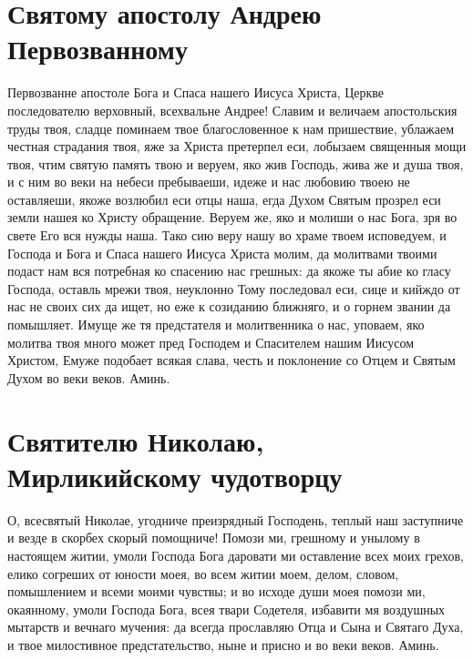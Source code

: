 \section{Святому апостолу Андрею Первозванному}
 


Первозванне апостоле Бога и Спаса нашего Иисуса Христа, Церкве последователю верховный, всехвальне Андрее! Славим и величаем апостольския труды твоя, сладце поминаем твое благословенное к нам пришествие, ублажаем честная страдания твоя, яже за Христа претерпел еси, лобызаем священныя мощи твоя, чтим святую память твою и веруем, яко жив Господь, жива же и душа твоя, и с ним во веки на небеси пребываеши, идеже и нас любовию твоею не оставляеши, якоже возлюбил еси отцы наша, егда Духом Святым прозрел еси земли нашея ко Христу обращение. Веруем же, яко и молиши о нас Бога, зря во свете Его вся нужды наша. Тако сию веру нашу во храме твоем исповедуем, и Господа и Бога и Спаса нашего Иисуса Христа молим, да молитвами твоими подаст нам вся потребная ко спасению нас грешных: да якоже ты абие ко гласу Господа, оставль мрежи твоя, неуклонно Тому последовал еси, сице и кийждо от нас не своих сих да ищет, но еже к созиданию ближняго, и о горнем звании да помышляет. Имуще же тя предстателя и молитвенника о нас, уповаем, яко молитва твоя много может пред Господем и Спасителем нашим Иисусом Христом, Емуже подобает всякая слава, честь и поклонение со Отцем и Святым Духом во веки веков. Аминь. 



 



\vspace{-\baselineskip}\section{Святителю Николаю, Мирликийскому чудотворцу}
 


О, всесвятый Николае, угодниче преизрядный Господень, теплый наш заступниче и везде в скорбех скорый помощниче! Помози ми, грешному и унылому в настоящем житии, умоли Господа Бога даровати ми оставление всех моих грехов, елико согреших от юности моея, во всем житии моем, делом, словом, помышлением и всеми моими чувствы; и во исходе души моея помози ми, окаянному, умоли Господа Бога, всея твари Содетеля, избавити мя воздушных мытарств и вечнаго мучения: да всегда прославляю Отца и Сына и Святаго Духа, и твое милостивное предстательство, ныне и присно и во веки веков. Аминь. 
\longpage[3]{}\mychapterending

